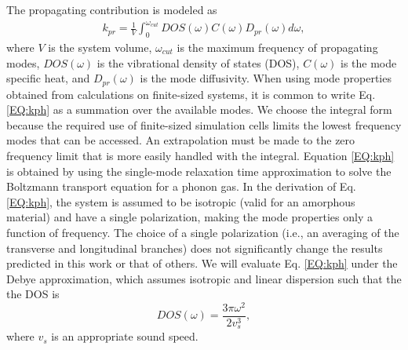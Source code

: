 The propagating contribution is modeled as
\cite{feldman_thermal_1993,feldman_numerical_1999} 
\begin{equation}\label{EQ:kph}
\begin{split}
k_{pr} = \frac{1}{V}\int_{0}^{\omega_{cut}} 
DOS(\omega) C(\omega) D_{pr}(\omega)d\omega,
\end{split}
\end{equation}
where $V$ is the system volume, $\omega_{cut}$ is the maximum 
frequency of propagating modes,  
$DOS(\omega)$ is the vibrational 
density of states (DOS), $C(\omega)$ is the mode specific heat, 
and $D_{pr}(\omega)$ is the mode diffusivity. When using mode 
properties obtained from calculations on finite-sized systems, 
it is common 
to write Eq. \eqref{EQ:kph} as a summation over the available modes.
\cite{feldman_thermal_1993,feldman_numerical_1999}
We choose the integral form because the required use of finite-sized 
simulation cells limits the lowest frequency 
modes that can be accessed. An extrapolation 
must be made to the zero frequency limit that is more easily 
handled with the integral.
\cite{love_estimate_1990,feldman_thermal_1993,cahill_thermal_1994,
feldman_numerical_1999,baldi_thermal_2008,
liu_high_2009,yang_anomalously_2010}    
Equation \eqref{EQ:kph} is obtained by using the single-mode relaxation
time approximation to solve 
the Boltzmann transport equation for a phonon gas.
\cite{ziman_electrons_2001} In the derivation of Eq. 
\eqref{EQ:kph}, the system is assumed to be isotropic 
(valid for an amorphous material) 
and have a single polarization, 
making the mode properties only a function of frequency. The 
choice of a single polarization (i.e., an averaging 
of the transverse and longitudinal branches) 
does not significantly change the results predicted in this work  
or that of others.
\cite{feldman_thermal_1993,cahill_thermal_1994,
feldman_numerical_1999,baldi_thermal_2008,liu_high_2009,
yang_anomalously_2010} 
We will evaluate Eq. \eqref{EQ:kph} under the Debye approximation, 
which assumes isotropic and linear dispersion such that the 
the DOS is
\begin{equation}\label{EQ:DOS_debye}
DOS(\omega) = \frac{3\pi\omega^2}{2v_{s}^3},
\end{equation}
where $v_s$ is an appropriate sound speed.\cite{ashcroft_solid_1976} 


